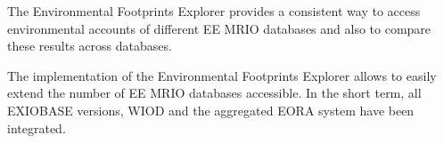 The Environmental Footprints Explorer provides a consistent way to access environmental accounts of different EE MRIO databases and also to compare these results across databases.

The implementation of the Environmental Footprints Explorer allows to easily extend the number of EE MRIO databases accessible. In the short term, all EXIOBASE versions, WIOD and the aggregated EORA system have been integrated. 